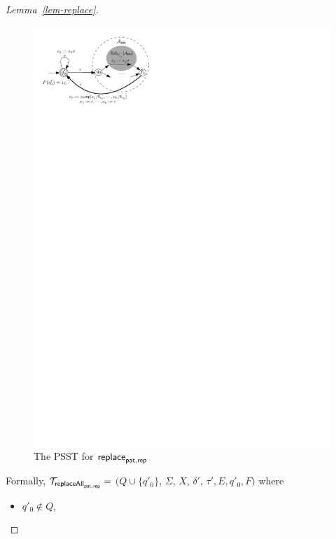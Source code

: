 \begin{proof}[Lemma~\ref{lem-replace}]
\begin{figure}[ht]
\centering
\includegraphics[scale=0.8]{psst-replace.pdf}
\caption{The PSST for $\mathsf{replace}_{\mathsf{pat},\mathsf{rep}}$}
\label{fig-psst-replace}
\end{figure}

Formally, $\mathcal{T}_{\mathsf{replaceAll}_{\mathsf{pat}, \mathsf{rep}}} =$ $(Q \cup \{q'_0\}$, $\Sigma$, $X$, $\delta'$, $\tau', E, q'_0, F)$ where
\begin{itemize}
\item $q'_0 \not \in Q$,


\end{itemize}
\end{proof}
